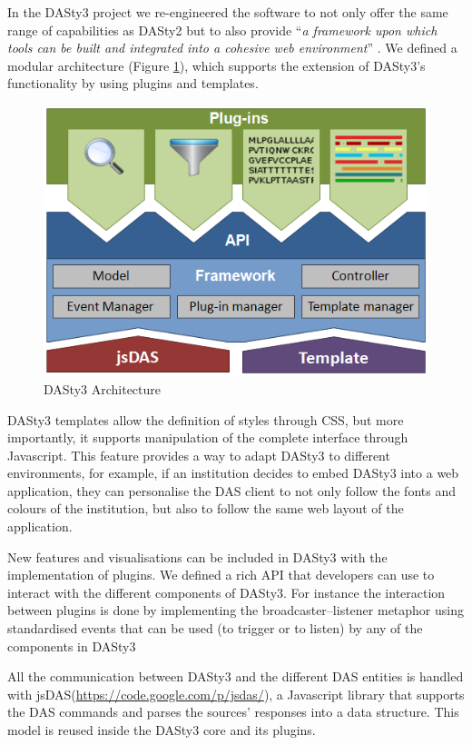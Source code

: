 In the DASty3 project we re-engineered the software to not only offer the same range of capabilities as DASty2 but to also provide ``\emph{a framework upon which tools can be built and integrated into a cohesive web environment}'' \cite{VIL2011}. We defined a modular architecture (Figure \ref{fig:dasty-architecture}), which supports the extension of DASty3's functionality by using plugins and templates.

\begin{figure}[ht]
\centering
\includegraphics[width=4.5in]{figures/dasty3_architecture.png} 
\caption{DASty3 Architecture}  \label{fig:dasty-architecture}
\end{figure}

DASty3 templates allow the definition of styles through CSS, but more importantly, it supports manipulation of the complete interface through Javascript. This feature provides a way to adapt DASty3 to different environments, for example, if an institution decides to embed DASty3 into a web application, they can personalise the DAS client to not only follow the fonts and colours of the institution, but also to follow the same web layout of the application.

New features and visualisations can be included in DASty3 with the implementation of plugins. We defined a rich API that developers can use to interact with the different components of DASty3. For instance the interaction between plugins is done by implementing the broadcaster--listener metaphor using standardised events that can be used (to trigger or to listen) by any of the components in DASty3

All the communication between DASty3 and the different DAS entities is handled with jsDAS(\url{https://code.google.com/p/jsdas/}), a Javascript library that supports the DAS commands and parses the sources' responses into a data structure. This model is reused inside the DASty3 core and its plugins.

